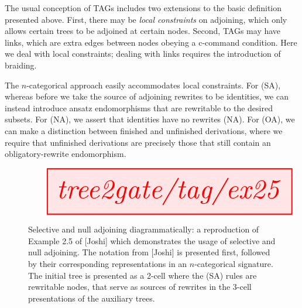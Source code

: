 
The usual conception of TAGs includes two extensions to the basic definition presented above. First, there may be \emph{local constraints} on adjoining, which only allows certain trees to be adjoined at certain nodes. Second, TAGs may have links, which are extra edges between nodes obeying a c-command condition. Here we deal with local constraints; dealing with links requires the introduction of braiding.

The $n$-categorical approach easily accommodates local constraints. For (SA), whereas before we take the source of adjoining rewrites to be identities, we can instead introduce ansatz endomorphisms that are rewritable to the desired subsets. For (NA), we assert that identities have no rewrites (NA). For (OA), we can make a distinction between finished and unfinished derivations, where we require that unfinished derivations are precisely those that still contain an obligatory-rewrite endomorphism.

\begin{figure}[h!]
\centering
\[\resizebox{\textwidth}{!}{\tikzfig{tree2gate/tag/ex25}}\]
\caption{
Selective and null adjoining diagrammatically: a reproduction of Example 2.5 of [Joshi] which demonstrates the usage of selective and null adjoining. The notation from [Joshi] is presented first, followed by their corresponding representations in an $n$-categorical signature. The initial tree is presented as a 2-cell where the (SA) rules are rewritable nodes, that serve as sources of rewrites in the 3-cell presentations of the auxiliary trees.
}
\end{figure}

